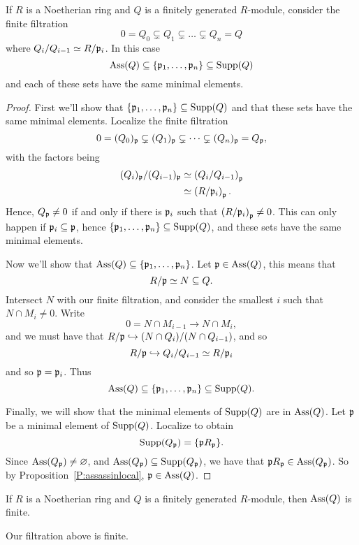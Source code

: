 \documentclass{ximera}
\begin{document}
\begin{theorem}
  If $R$ is a Noetherian ring and $Q$ is a finitely generated
  $R$-module, consider the finite filtration
  \[
  0 = Q_0 \subsetneq Q_1 \subsetneq \dots \subsetneq Q_n = Q 
  \]
  where $Q_i/Q_{i-1} \simeq R/\mathfrak{p}_i$. In this case
  \[
  \operatorname{Ass}(Q) \subseteq \{\mathfrak{p}_1,\dots,\mathfrak{p}_n\}\subseteq \operatorname{Supp}(Q)
  \]
  and each of these sets have the same minimal elements.
  \begin{proof}
    First we'll show that $\{\mathfrak{p}_1,\dots,\mathfrak{p}_n\}\subseteq \operatorname{Supp}(Q)$ and
    that these sets have the same minimal elements. Localize the
    finite filtration
    \[
    0 = (Q_0)_{\mathfrak{p}} \subsetneq (Q_1)_{\mathfrak{p}} \subsetneq \dots \subsetneq (Q_n)_{\mathfrak{p}} = Q_{\mathfrak{p}},
    \]
    with the factors being
    \begin{align*}
      (Q_i)_{\mathfrak{p}}/(Q_{i-1})_{\mathfrak{p}} &\simeq \left(Q_i/Q_{i-1}\right)_{\mathfrak{p}}\\
      &\simeq \left(R/\mathfrak{p}_i\right)_{\mathfrak{p}}.
    \end{align*}
    Hence, $Q_{\mathfrak{p}} \ne 0$ if and only if there is $\mathfrak{p}_i$ such that
    $\left(R/\mathfrak{p}_i\right)_{\mathfrak{p}} \ne 0$. This can only happen if
    $\mathfrak{p}_i\subseteq\mathfrak{p}$, hence $\{\mathfrak{p}_1,\dots,\mathfrak{p}_n\}\subseteq \operatorname{Supp}(Q)$, and
    these sets have the same minimal elements.

    Now we'll show that $\operatorname{Ass}(Q)\subseteq\{\mathfrak{p}_1,\dots,\mathfrak{p}_n\}$. Let
    $\mathfrak{p}\in\operatorname{Ass}(Q)$, this means that
    \[
    R/\mathfrak{p} \simeq N \subseteq Q.
    \]
    Intersect $N$ with our finite filtration, and consider the
    smallest $i$ such that $N\cap M_i\ne 0$. Write
    \[
    0=N\cap M_{i-1}\to N\cap M_i,
    \]
    and we must have that $R/\mathfrak{p} \hookrightarrow (N\cap Q_i)/(N\cap Q_{i-1})$, and so
    \[
    R/\mathfrak{p} \hookrightarrow Q_i/Q_{i-1} \simeq R/\mathfrak{p}_i
    \]
    and so $\mathfrak{p}=\mathfrak{p}_i$. Thus
    \[
    \operatorname{Ass}(Q)\subseteq\{\mathfrak{p}_1,\dots,\mathfrak{p}_n\}\subseteq \operatorname{Supp}(Q).
    \]

    Finally, we will show that the minimal elements of $\operatorname{Supp}(Q)$ are
    in $\operatorname{Ass}(Q)$. Let $\mathfrak{p}$ be a minimal element of
    $\operatorname{Supp}(Q)$. Localize to obtain
    \[
    \operatorname{Supp}(Q_{\mathfrak{p}}) =\{\mathfrak{p} R_{\mathfrak{p}}\}.
    \]
    Since $\operatorname{Ass}(Q_{\mathfrak{p}})\ne \varnothing$, and
    $\operatorname{Ass}(Q_{\mathfrak{p}})\subseteq\operatorname{Supp}(Q_{\mathfrak{p}})$, we have that $\mathfrak{p}
    R_{\mathfrak{p}}\in\operatorname{Ass}(Q_{\mathfrak{p}})$. So by Proposition~\ref{P:assassinlocal},
    $\mathfrak{p}\in\operatorname{Ass}(Q)$.
  \end{proof}
\end{theorem}


\begin{corollary}
  If $R$ is a Noetherian ring and $Q$ is a finitely generated
  $R$-module, then $\operatorname{Ass}(Q)$ is finite.
  \begin{sketch}
    Our filtration above is finite.
  \end{sketch}
\end{corollary}
\end{document}
